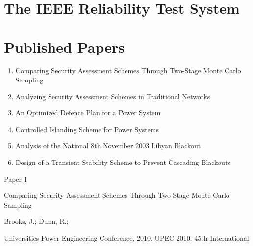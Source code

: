 \documentclass[a4paper,oneside,12pt]{report}
\begin{document}
\chapter{The IEEE Reliability Test System}\label{paper_rts}



\chapter{Published Papers}

\begin{large}
\begin{enumerate}
\item Comparing Security Assessment Schemes Through Two-Stage Monte Carlo Sampling
\item Analyzing Security Assessment Schemes in Traditional Networks
\item An Optimized Defence Plan for a Power System
\item Controlled Islanding Scheme for Power Systems
\item Analysis of the National 8th November 2003 Libyan Blackout
\item Design of a Transient Stability Scheme to Prevent Cascading Blackouts
\end{enumerate}
\end{large}

\pagebreak


\begin{center}\begin{large}
{\Huge Paper 1}
\vspace{40px}

Comparing Security Assessment Schemes Through Two-Stage Monte Carlo Sampling
\vspace{40px}

Brooks, J.; Dunn, R.;
\vspace{40px}

Universities Power Engineering Conference, 2010. UPEC 2010. 45th International
\end{large}\end{center}



\end{document}

